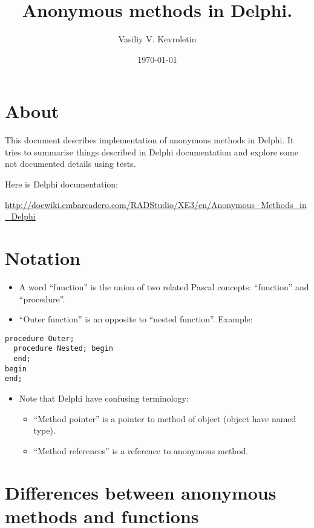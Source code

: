 \documentclass[11pt]{article}
\title{Anonymous methods in Delphi.}
\author{Vasiliy V. Kevroletin}
\date{\today}
\begin{document}
\maketitle

\setcounter{tocdepth}{3}
\tableofcontents
\vspace*{1cm}

\section{About}
\label{sec-1}


This document describes implementation of anonymous methods in Delphi.
It tries to summarise things described in Delphi documentation and
explore some not documented details using tests.

Here is Delphi documentation:

\href{http://docwiki.embarcadero.com/RADStudio/XE3/en/Anonymous_Methods_in_Delphi}{http://docwiki.embarcadero.com/RADStudio/XE3/en/Anonymous\_Methods\_in\_Delphi}
\section{Notation}
\label{sec-2}


\begin{itemize}
\item A word ``function'' is the union of two related Pascal concepts: ``function''
    and ``procedure''.
\item ``Outer function'' is an opposite to ``nested function''. Example:
\end{itemize}


\begin{verbatim}
procedure Outer;
  procedure Nested; begin
  end;
begin
end;
\end{verbatim}
  
\begin{itemize}
\item Note that Delphi have confusing terminology:
\begin{itemize}
\item ``Method pointer'' is a pointer to method of object (object have named type).
\item ``Method references'' is a reference to anonymous method.
\end{itemize}
\end{itemize}
\section{Differences between anonymous methods and functions}
\label{sec-3}
\end{document}
